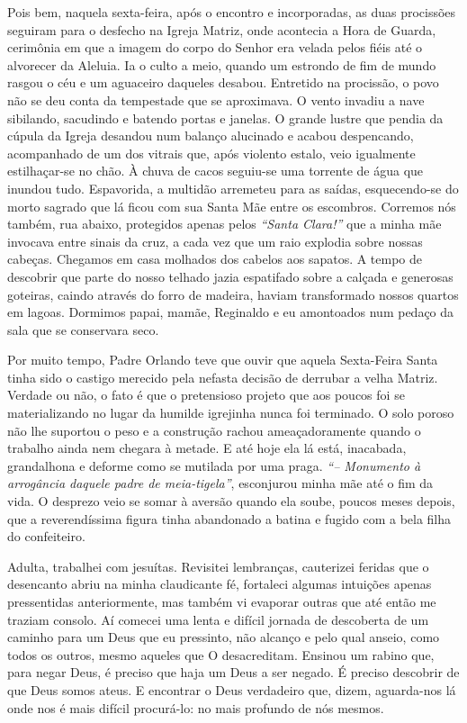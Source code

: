 Pois bem, naquela sexta-feira, após o encontro e incorporadas, as duas procissões seguiram para o desfecho na Igreja Matriz, onde acontecia a Hora de Guarda, cerimônia em que a imagem do corpo do Senhor era velada pelos fiéis até o alvorecer da Aleluia. 
Ia o culto a meio, quando um estrondo de fim de mundo rasgou o céu e um aguaceiro daqueles desabou. 
Entretido na procissão, o povo não se deu conta da tempestade que se aproximava. 
O vento invadiu a nave sibilando, sacudindo e batendo portas e janelas. 
O grande lustre que pendia da cúpula da Igreja desandou num balanço alucinado e acabou despencando, acompanhado de um dos vitrais que, após violento estalo, veio igualmente estilhaçar-se no chão. 
À chuva de cacos seguiu-se uma torrente de água que inundou tudo. 
Espavorida, a multidão arremeteu para as saídas, esquecendo-se do morto sagrado que lá ficou com sua Santa Mãe entre os escombros. 
Corremos nós também, rua abaixo, protegidos apenas pelos \textit{``Santa Clara!''} que a minha mãe invocava entre sinais da cruz, a cada vez que um raio explodia sobre nossas cabeças. 
Chegamos em casa molhados dos cabelos aos sapatos. 
A tempo de descobrir que parte do nosso telhado jazia espatifado sobre a calçada e generosas goteiras, caindo através do forro de madeira, haviam transformado nossos quartos em lagoas. 
Dormimos papai, mamãe, Reginaldo e eu amontoados num pedaço da sala que se conservara seco.

Por muito tempo, Padre Orlando teve que ouvir que aquela Sexta-Feira Santa tinha sido o castigo merecido pela nefasta decisão de derrubar a velha Matriz. 
Verdade ou não, o fato é que o pretensioso projeto que aos poucos foi se materializando no lugar da humilde igrejinha nunca foi terminado. 
O solo poroso não lhe suportou o peso e a construção rachou ameaçadoramente quando o trabalho ainda nem chegara à metade. 
E até hoje ela lá está, inacabada, grandalhona e deforme como se mutilada por uma praga. 
\textit{``-- Monumento à arrogância daquele padre de meia-tigela''}, esconjurou minha mãe até o fim da vida. 
O desprezo veio se somar à aversão quando ela soube, poucos meses depois, que a reverendíssima figura tinha abandonado a batina e fugido com a bela filha do confeiteiro.

Adulta, trabalhei com jesuítas. Revisitei lembranças, cauterizei feridas que o desencanto abriu na minha claudicante fé, fortaleci algumas intuições apenas pressentidas anteriormente, mas também vi evaporar outras que até então me traziam consolo. Aí comecei uma lenta e difícil jornada de descoberta de um caminho para um Deus que eu pressinto, não alcanço e pelo qual anseio, como todos os outros, mesmo aqueles que O desacreditam.  Ensinou um rabino que, para negar Deus, é preciso que haja um Deus a ser negado. É preciso descobrir de que Deus somos ateus. E encontrar o Deus verdadeiro que, dizem, aguarda-nos lá onde nos é mais difícil procurá-lo: no mais profundo de nós mesmos. 